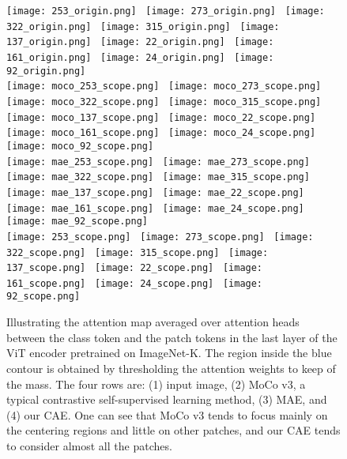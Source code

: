 \documentclass[twocolumn]{svjour3}          \smartqed  \usepackage{graphicx}
\begin{document}
\begin{figure*}[t]
\centering
\footnotesize
\texttt{[image: 253\_origin.png]}~
\texttt{[image: 273\_origin.png]}~
\texttt{[image: 322\_origin.png]}~
\texttt{[image: 315\_origin.png]}~
\texttt{[image: 137\_origin.png]}~
\texttt{[image: 22\_origin.png]}~
\texttt{[image: 161\_origin.png]}~
\texttt{[image: 24\_origin.png]}~
\texttt{[image: 92\_origin.png]}\\
\vspace{1mm}
\texttt{[image: moco\_253\_scope.png]}~
\texttt{[image: moco\_273\_scope.png]}~
\texttt{[image: moco\_322\_scope.png]}~
\texttt{[image: moco\_315\_scope.png]}~
\texttt{[image: moco\_137\_scope.png]}~
\texttt{[image: moco\_22\_scope.png]}~
\texttt{[image: moco\_161\_scope.png]}~
\texttt{[image: moco\_24\_scope.png]}~
\texttt{[image: moco\_92\_scope.png]}\\
\vspace{1mm}
\texttt{[image: mae\_253\_scope.png]}~
\texttt{[image: mae\_273\_scope.png]}~
\texttt{[image: mae\_322\_scope.png]}~
\texttt{[image: mae\_315\_scope.png]}~
\texttt{[image: mae\_137\_scope.png]}~
\texttt{[image: mae\_22\_scope.png]}~
\texttt{[image: mae\_161\_scope.png]}~
\texttt{[image: mae\_24\_scope.png]}~
\texttt{[image: mae\_92\_scope.png]}\\
\vspace{1mm}
\texttt{[image: 253\_scope.png]}~
\texttt{[image: 273\_scope.png]}~
\texttt{[image: 322\_scope.png]}~
\texttt{[image: 315\_scope.png]}~
\texttt{[image: 137\_scope.png]}~
\texttt{[image: 22\_scope.png]}~
\texttt{[image: 161\_scope.png]}~
\texttt{[image: 24\_scope.png]}~
\texttt{[image: 92\_scope.png]}\\
\caption{Illustrating
the attention map
averaged over  attention heads
between the class token
and the patch tokens 
in the last layer
of the ViT encoder
pretrained on ImageNet-K.
The region inside the blue contour is obtained by thresholding the attention weights to keep  of the mass.
The four rows are: (1) input image,
(2) MoCo v3,
a typical contrastive self-supervised learning method,
(3) MAE, and (4) our CAE.
One can see that 
MoCo v3 tends to focus 
mainly on the centering regions 
and little on other patches,
and our CAE tends to consider
almost all the patches.
}
\label{fig:patchimportance}
\vspace{-0.4cm}
\end{figure*}
\end{document}
